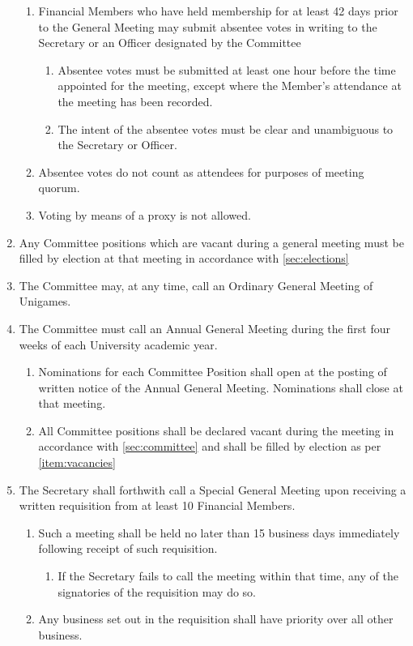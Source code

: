\documentclass[a4paper]{article}
\begin{document}
\begin{enumerate}
        \begin{enumerate}
            \item Financial Members who have held membership for at least 42 days prior to the General Meeting may submit absentee votes in writing to the Secretary or an Officer designated by the Committee
            \begin{enumerate}
                \item Absentee votes must be submitted at least one hour before the time appointed for the meeting, except where the Member’s attendance at the meeting has been recorded.
                \item The intent of the absentee votes must be clear and unambiguous to the Secretary or Officer.
            \end{enumerate}
            \item Absentee votes do not count as attendees for purposes of meeting quorum.
            \item Voting by means of a proxy is not allowed.
        \end{enumerate}
    \item \label{item:vacancies} Any Committee positions which are vacant during a general meeting must be filled by election at that meeting in accordance with \cref{sec:elections}
    \item The Committee may, at any time, call an Ordinary General Meeting of Unigames.
    \item The Committee must call an Annual General Meeting during the first four weeks of each University academic year.
        \begin{enumerate}
            \item Nominations for each Committee Position shall open at the posting of written notice of the Annual General Meeting. Nominations shall close at that meeting.
            \item All Committee positions shall be declared vacant during the meeting in accordance with \cref{sec:committee} and shall be filled by election as per \cref{item:vacancies}
        \end{enumerate}
    \item The Secretary shall forthwith call a Special General Meeting upon receiving a written requisition from at least 10 Financial Members.
        \begin{enumerate}
            \item Such a meeting shall be held no later than 15 business days immediately following receipt of such requisition.
            \begin{enumerate}
                \item If the Secretary fails to call the meeting within that time, any of the signatories of the requisition may do so.
            \end{enumerate}
            \item \label{item:sgm_priority} Any business set out in the requisition shall have priority over all other business.
        \end{enumerate}
\end{enumerate}
\end{document}
